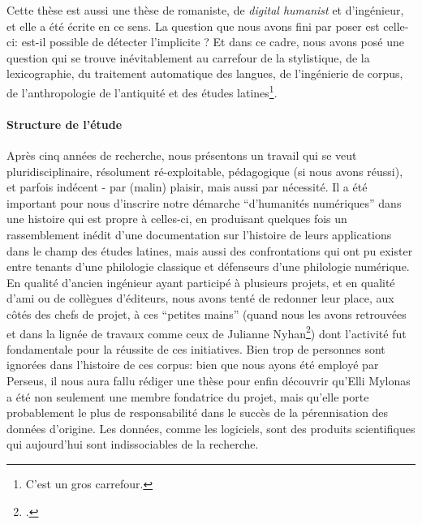 Cette thèse est aussi une thèse de romaniste, de \textit{digital humanist} et d'ingénieur, et elle a été écrite en ce sens. La question que nous avons fini par poser est celle-ci: est-il possible de détecter l'implicite ? Et dans ce cadre, nous avons posé une question qui se trouve inévitablement au carrefour de la stylistique, de la lexicographie, du traitement automatique des langues, de l'ingénierie de corpus, de l'anthropologie de l'antiquité et des études latines\footnote{C'est un gros carrefour.}.



\paragraph{Structure de l'étude}

Après cinq années de recherche, nous présentons un travail qui se veut pluridisciplinaire, résolument ré-exploitable, pédagogique (si nous avons réussi), et parfois indécent - par (malin) plaisir, mais aussi par nécessité. Il a été important pour nous d'inscrire notre démarche \enquote{d'humanités numériques} dans une histoire qui est propre à celles-ci, en produisant quelques fois un rassemblement inédit d'une documentation sur l'histoire de leurs applications dans le champ des études latines, mais aussi des confrontations qui ont pu exister entre tenants d'une philologie classique et défenseurs d'une philologie numérique. En qualité d'ancien ingénieur ayant participé à plusieurs projets, et en qualité d'ami ou de collègues d'éditeurs, nous avons tenté de redonner leur place, aux côtés des chefs de projet, à ces \enquote{petites mains} (quand nous les avons retrouvées et dans la lignée de travaux comme ceux de Julianne Nyhan\footcite{nyhan2017uncovering}) dont l'activité fut fondamentale pour la réussite de ces initiatives. Bien trop de personnes sont ignorées dans l'histoire de ces corpus: bien que nous ayons été employé par Perseus, il nous aura fallu rédiger une thèse pour enfin découvrir qu'Elli Mylonas a été non seulement une membre fondatrice du projet, mais qu'elle porte probablement le plus de responsabilité dans le succès de la pérennisation des données d'origine. Les données, comme les logiciels, sont des produits scientifiques qui aujourd'hui sont indissociables de la recherche.

